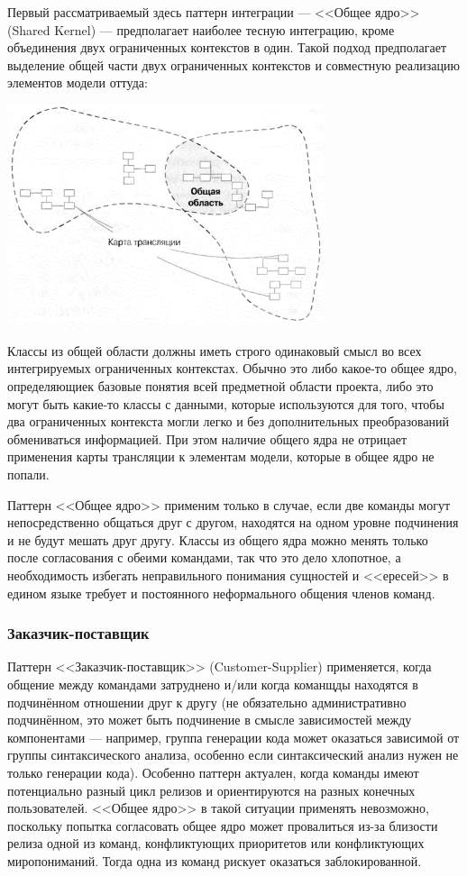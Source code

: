\documentclass[a5paper]{article}
\begin{document}
Первый рассматриваемый здесь паттерн интеграции --- <<Общее ядро>> (Shared Kernel) --- предполагает наиболее тесную интеграцию, кроме объединения двух ограниченных контекстов в один. Такой подход предполагает выделение общей части двух ограниченных контекстов и совместную реализацию элементов модели оттуда:

\begin{center}
    \includegraphics[width=0.7\textwidth]{sharedKernel.png}
\end{center}

Классы из общей области должны иметь строго одинаковый смысл во всех интегрируемых ограниченных контекстах. Обычно это либо какое-то общее ядро, определяющиек базовые понятия всей предметной области проекта, либо это могут быть какие-то классы с данными, которые используются для того, чтобы два ограниченных контекста могли легко и без дополнительных преобразований обмениваться информацией. При этом наличие общего ядра не отрицает применения карты трансляции к элементам модели, которые в общее ядро не попали.

Паттерн <<Общее ядро>> применим только в случае, если две команды могут непосредственно общаться друг с другом, находятся на одном уровне подчинения и не будут мешать друг другу. Классы из общего ядра можно менять только после согласования с обеими командами, так что это дело хлопотное, а необходимость избегать неправильного понимания сущностей и <<ересей>> в едином языке требует и постоянного неформального общения членов команд.

\subsubsection{Заказчик-поставщик}

Паттерн <<Заказчик-поставщик>> (Customer-Supplier) применяется, когда общение между командами затруднено и/или когда команщды находятся в подчинённом отношении друг к другу (не обязательно административно подчинённом, это может быть подчинение в смысле зависимостей между компонентами --- например, группа генерации кода может оказаться зависимой от группы синтаксического анализа, особенно если синтаксический анализ нужен не только генерации кода). Особенно паттерн актуален, когда команды имеют потенциально разный цикл релизов и ориентируются на разных конечных пользователей. <<Общее ядро>> в такой ситуации применять невозможно, поскольку попытка согласовать общее ядро может провалиться из-за близости релиза одной из команд, конфликтующих приоритетов или конфликтующих миропониманий. Тогда одна из команд рискует оказаться заблокированной.
\end{document}
